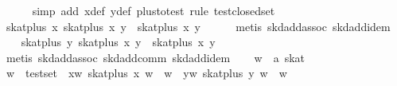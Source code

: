 \begin{isabellebody}
\ \ \ \ \isamarkupfalse%
\ {}simp\ add{}\ x{}{}def\ y{}{}def\ plus{}to{}test{}\ rule\ test{}closed{}set{}\isanewline
\isanewline
\ \ \isamarkupfalse%
\ {}skat{}plus\ x\ {}skat{}plus\ x\ y{}\ {}\ skat{}plus\ x\ y{}\isanewline
\ \ \ \ \isamarkupfalse%
\ {}metis\ skd{}add{}assoc\ skd{}add{}idem{}\isanewline
\isanewline
\ \ \isamarkupfalse%
\ {}skat{}plus\ y\ {}skat{}plus\ x\ y{}\ {}\ skat{}plus\ x\ y{}\isanewline
\ \ \ \ \isamarkupfalse%
\ {}metis\ skd{}add{}assoc\ skd{}add{}comm\ skd{}add{}idem{}\isanewline
\isanewline
\ \ \isamarkupfalse%
\ w\ {}{}\ {}{}a\ skat{}\isanewline
\ \ \isamarkupfalse%
\ {}w\ {}\ test{}set{}\ \ xw{}\ {}skat{}plus\ x\ w\ {}\ w{}\ \ yw{}\ {}skat{}plus\ y\ w\ {}\ w{}\isanewline

\end{isabellebody}
